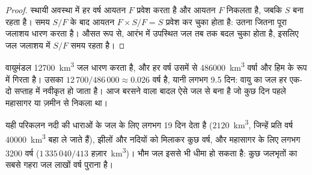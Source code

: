 \begin{proof}
स्थायी अवस्था में हर वर्ष आयतन $F$ प्रवेश करता है और आयतन $F$ निकलता है, जबकि
 $S$ बना रहता है। समय $S/F$ के बाद आयतन $F \times S/F = S$
प्रवेश कर चुका होता है: उतना जितना पूरा जलाशय धारण करता है। औसत रूप से, आरंभ में
उपस्थित जल तब तक बदल चुका होता है, इसलिए जल जलाशय में $S/F$ समय रहता है।
\end{proof}

\begin{example}[वायु में जल]\label{ex:g10:freshwater-resources:atmosphere}
वायुमंडल \num{12700}~\unit{km^3} जल धारण करता है, और
हर वर्ष उसमें से \num{486000}~\unit{km^3} वर्षा और हिम के रूप में गिरता है। उसका
 $12\,700/486\,000 \approx \num{0.026}$ वर्ष है, यानी लगभग
\num{9.5} दिन: वायु का जल हर एक-दो सप्ताह में नवीकृत हो जाता है। आज बरसने वाला
बादल ऐसे जल से बना है जो कुछ दिन पहले महासागर या ज़मीन से
निकला था।
\end{example}

यही परिकलन नदी की धाराओं के जल के लिए लगभग \num{19} दिन देता है
($2120$~\unit{km^3}, जिन्हें प्रति वर्ष \num{40000}~\unit{km^3} बहा ले जाते हैं), झीलों और नदियों को
मिलाकर कुछ वर्ष, और महासागर के लिए लगभग \num{3200} वर्ष
($1\,335\,040/413$ हज़ार~\unit{km^3})। भौम जल इससे भी धीमा हो सकता है:
कुछ जलभृतों का सबसे गहरा जल लाखों वर्ष पुराना है।


